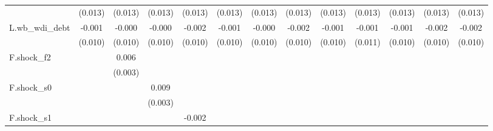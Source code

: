 {\begin{tabular}{l*{12}{c}}
            &     (0.013)         &     (0.013)         &     (0.013)         &     (0.013)         &     (0.013)         &     (0.013)         &     (0.013)         &     (0.013)         &     (0.013)         &     (0.013)         &     (0.013)         &     (0.013)         \\
\addlinespace
L.wb\_wdi\_debt&      -0.001         &      -0.000         &      -0.000         &      -0.002         &      -0.001         &      -0.000         &      -0.002         &      -0.001         &      -0.001         &      -0.001         &      -0.002         &      -0.002         \\
            &     (0.010)         &     (0.010)         &     (0.010)         &     (0.010)         &     (0.010)         &     (0.010)         &     (0.010)         &     (0.010)         &     (0.011)         &     (0.010)         &     (0.010)         &     (0.010)         \\
\addlinespace
F.shock\_f2  &                     &       0.006\sym{*}  &                     &                     &                     &                     &                     &                     &                     &                     &                     &                     \\
            &                     &     (0.003)         &                     &                     &                     &                     &                     &                     &                     &                     &                     &                     \\
\addlinespace
F.shock\_s0  &                     &                     &       0.009\sym{***}&                     &                     &                     &                     &                     &                     &                     &                     &                     \\
            &                     &                     &     (0.003)         &                     &                     &                     &                     &                     &                     &                     &                     &                     \\
\addlinespace
F.shock\_s1  &                     &                     &                     &      -0.002         &                     &                     &                     &                     &                     &                     &                     &                     \\

\end{tabular}}
